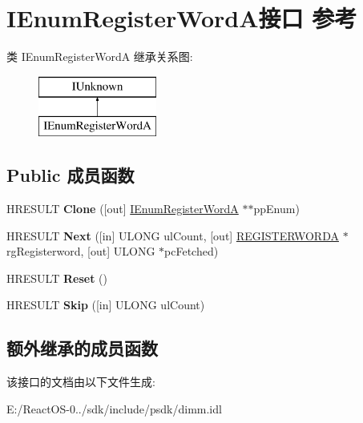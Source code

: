 \hypertarget{interface_i_enum_register_word_a}{}\section{I\+Enum\+Register\+Word\+A接口 参考}
\label{interface_i_enum_register_word_a}
类 I\+Enum\+Register\+WordA 继承关系图\+:\begin{figure}[H]
\begin{center}
\leavevmode
\includegraphics[height=2.000000cm]{interface_i_enum_register_word_a}
\end{center}
\end{figure}
\subsection*{Public 成员函数}
\begin{DoxyCompactItemize}
\item 
\mbox{\label{interface_i_enum_register_word_a_ad7059fdd9a380238c90170845c700e8a}} 
H\+R\+E\+S\+U\+LT {\bfseries Clone} (\mbox{[}out\mbox{]} \hyperlink{interface_i_enum_register_word_a}{I\+Enum\+Register\+WordA} $\ast$$\ast$pp\+Enum)
\item 
\mbox{\label{interface_i_enum_register_word_a_a14a3ab726e3926fa0fb19b5d62d042ec}} 
H\+R\+E\+S\+U\+LT {\bfseries Next} (\mbox{[}in\mbox{]} U\+L\+O\+NG ul\+Count, \mbox{[}out\mbox{]} \hyperlink{struct_r_e_g_i_s_t_e_r_w_o_r_d_a}{R\+E\+G\+I\+S\+T\+E\+R\+W\+O\+R\+DA} $\ast$rg\+Registerword, \mbox{[}out\mbox{]} U\+L\+O\+NG $\ast$pc\+Fetched)
\item 
\mbox{\label{interface_i_enum_register_word_a_afd19051733010994ffdbd61af8fded57}} 
H\+R\+E\+S\+U\+LT {\bfseries Reset} ()
\item 
\mbox{\label{interface_i_enum_register_word_a_a5b8d6c3b258c9260922874c3b9120247}} 
H\+R\+E\+S\+U\+LT {\bfseries Skip} (\mbox{[}in\mbox{]} U\+L\+O\+NG ul\+Count)
\end{DoxyCompactItemize}
\subsection*{额外继承的成员函数}


该接口的文档由以下文件生成\+:\begin{DoxyCompactItemize}
\item 
E\+:/\+React\+O\+S-\/0../sdk/include/psdk/dimm.\+idl\end{DoxyCompactItemize}
